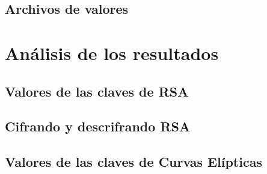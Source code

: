 \documentclass[a4paper, 11pt]{article}
\begin{document}
	\subsection{Archivos de valores}

\section{Análisis de los resultados}
	\subsection{Valores de las claves de RSA}
	
	\subsection{Cifrando y descrifrando RSA}
	
	\subsection{Valores de las claves de Curvas Elípticas}
\end{document}
